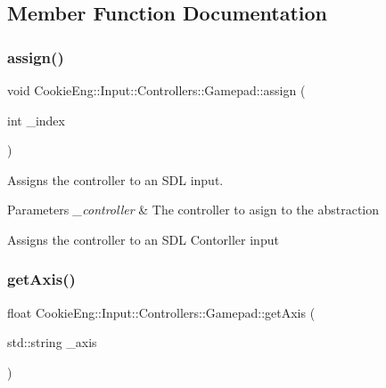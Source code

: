 \subsection{Member Function Documentation}
\mbox{\label{class_cookie_eng_1_1_input_1_1_controllers_1_1_gamepad_a82943bb75408298ac2f80e8f8d4a84b2}} 
\subsubsection{\texorpdfstring{assign()}{assign()}}
{\footnotesize\ttfamily void Cookie\+Eng\+::\+Input\+::\+Controllers\+::\+Gamepad\+::assign (\begin{DoxyParamCaption}\item[{int}]{\+\_\+index }\end{DoxyParamCaption})}



Assigns the controller to an S\+DL input. 


\begin{DoxyParams}{Parameters}
{\em \+\_\+controller} & The controller to asign to the abstraction\\
\hline
\end{DoxyParams}
Assigns the controller to an S\+DL Contorller input \mbox{\label{class_cookie_eng_1_1_input_1_1_controllers_1_1_gamepad_a5fde889f1054c3dbd25d5694b26f5c2e}} 
\subsubsection{\texorpdfstring{get\+Axis()}{getAxis()}}
{\footnotesize\ttfamily float Cookie\+Eng\+::\+Input\+::\+Controllers\+::\+Gamepad\+::get\+Axis (\begin{DoxyParamCaption}\item[{std\+::string}]{\+\_\+axis }\end{DoxyParamCaption})}



